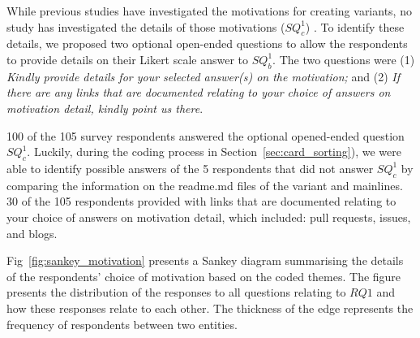 While previous studies have investigated the motivations for creating variants, no study has investigated the details of those motivations ($SQ^1_{c}$) .
To identify these details, we proposed two optional open-ended questions to allow the respondents to provide details on their Likert scale answer to $SQ^1_{b}$. The two questions were
(1) \emph{Kindly provide details for your selected answer(s) on the motivation;}
and (2) \emph{If there are any links that are documented relating to your choice of answers on motivation detail, kindly point us there}.

100 of the 105 survey respondents answered the optional opened-ended question $SQ^1_{c}$. Luckily, during the coding process in Section~\ref{sec:card_sorting}), we were able to identify possible answers of the 5 respondents that did not answer $SQ^1_{c}$ by comparing the information on the \textsf{readme.md} files of the variant and mainlines. 30 of the 105 respondents provided with links that are documented relating to your choice of answers on motivation detail, which included: pull requests, issues, and blogs.



Fig~\ref{fig:sankey_motivation} presents a Sankey diagram summarising the details of the respondents' choice of motivation based on the coded themes. 
The figure  presents the distribution of the responses to all questions relating to $RQ1$ and how these responses relate to each other. The thickness of the edge represents the frequency of respondents between two entities.

